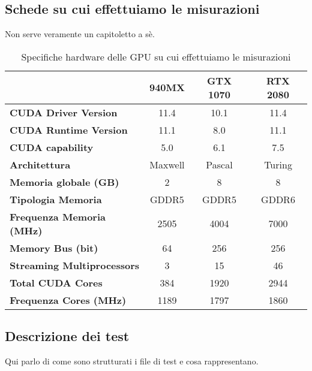 \documentclass{article}
\begin{document}
	\subsection{Schede su cui effettuiamo le misurazioni}
	Non serve veramente un capitoletto a sè.
	\begin{table}[!ht]
		\centering
		\begin{tabular}{|l|c|c|c|}
			\hline
			  & \textbf{940MX} & \textbf{GTX 1070} & \textbf{RTX 2080} \\ \hline
			\textbf{CUDA Driver Version} & 11.4 & 10.1 & 11.4 \\ \hline
			\textbf{CUDA Runtime Version} & 11.1 & 8.0 & 11.1 \\ \hline
			\textbf{CUDA capability} & 5.0 & 6.1 & 7.5 \\ \hline
			\textbf{Architettura} & Maxwell & Pascal & Turing \\ \hline
			\textbf{Memoria globale (GB)} & 2 & 8 & 8 \\ \hline
			\textbf{Tipologia Memoria} & GDDR5 & GDDR5 & GDDR6 \\ \hline
			\textbf{Frequenza Memoria (MHz)} & 2505 & 4004 & 7000 \\ \hline
			\textbf{Memory Bus (bit)} & 64 & 256 & 256 \\ \hline
			\textbf{Streaming Multiprocessors} & 3 & 15 & 46 \\ \hline
			\textbf{Total CUDA Cores} & 384 & 1920 & 2944 \\ \hline
			\textbf{Frequenza Cores (MHz)} & 1189 & 1797 & 1860 \\ \hline
		\end{tabular}
		\label{tab:specs_gpus}
		\caption{Specifiche hardware delle GPU su cui effettuiamo le misurazioni}
	\end{table}

	\subsection{Descrizione dei test}
	Qui parlo di come sono strutturati i file di test e cosa rappresentano.
	
\end{document}
